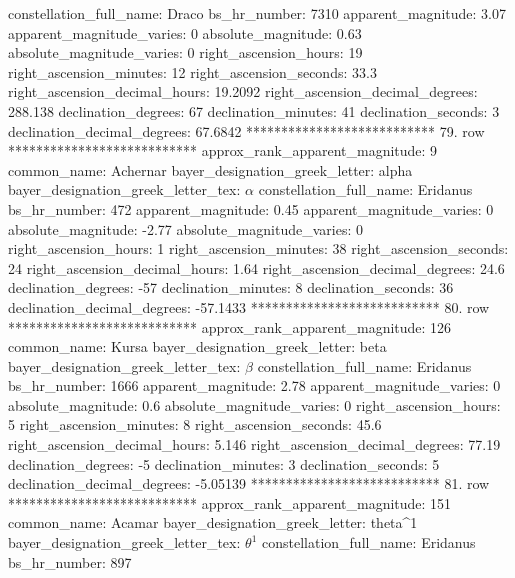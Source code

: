            constellation_full_name: Draco
                      bs_hr_number: 7310
                apparent_magnitude: 3.07
         apparent_magnitude_varies: 0
                absolute_magnitude: 0.63
         absolute_magnitude_varies: 0
             right_ascension_hours: 19
           right_ascension_minutes: 12
           right_ascension_seconds: 33.3
     right_ascension_decimal_hours: 19.2092
   right_ascension_decimal_degrees: 288.138
               declination_degrees: 67
               declination_minutes: 41
               declination_seconds: 3
       declination_decimal_degrees: 67.6842
*************************** 79. row ***************************
    approx_rank_apparent_magnitude: 9
                       common_name: Achernar
    bayer_designation_greek_letter: alpha
bayer_designation_greek_letter_tex: $\alpha$
           constellation_full_name: Eridanus
                      bs_hr_number: 472
                apparent_magnitude: 0.45
         apparent_magnitude_varies: 0
                absolute_magnitude: -2.77
         absolute_magnitude_varies: 0
             right_ascension_hours: 1
           right_ascension_minutes: 38
           right_ascension_seconds: 24
     right_ascension_decimal_hours: 1.64
   right_ascension_decimal_degrees: 24.6
               declination_degrees: -57
               declination_minutes: 8
               declination_seconds: 36
       declination_decimal_degrees: -57.1433
*************************** 80. row ***************************
    approx_rank_apparent_magnitude: 126
                       common_name: Kursa
    bayer_designation_greek_letter: beta
bayer_designation_greek_letter_tex: $\beta$
           constellation_full_name: Eridanus
                      bs_hr_number: 1666
                apparent_magnitude: 2.78
         apparent_magnitude_varies: 0
                absolute_magnitude: 0.6
         absolute_magnitude_varies: 0
             right_ascension_hours: 5
           right_ascension_minutes: 8
           right_ascension_seconds: 45.6
     right_ascension_decimal_hours: 5.146
   right_ascension_decimal_degrees: 77.19
               declination_degrees: -5
               declination_minutes: 3
               declination_seconds: 5
       declination_decimal_degrees: -5.05139
*************************** 81. row ***************************
    approx_rank_apparent_magnitude: 151
                       common_name: Acamar
    bayer_designation_greek_letter: theta^1
bayer_designation_greek_letter_tex: $\theta^1$
           constellation_full_name: Eridanus
                      bs_hr_number: 897
